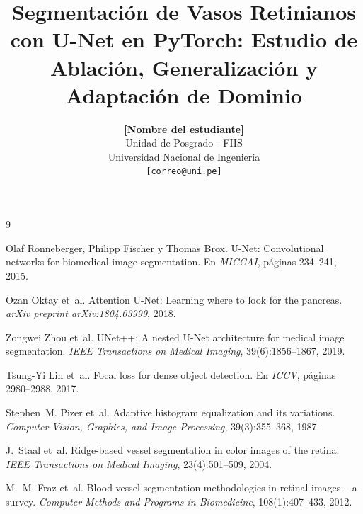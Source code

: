 \documentclass{article}
\title{Segmentación de Vasos Retinianos con U-Net en PyTorch: Estudio de Ablación, Generalización y Adaptación de Dominio}
\author{%
\textbf{[Nombre del estudiante]} \\
Unidad de Posgrado - FIIS \\
Universidad Nacional de Ingeniería \\
\texttt{[correo@uni.pe]}
}
\begin{document}
\maketitle










\begin{thebibliography}{9}

Olaf Ronneberger, Philipp Fischer y Thomas Brox.
\newblock U-Net: Convolutional networks for biomedical image segmentation.
\newblock En \emph{MICCAI}, páginas 234--241, 2015.

Ozan Oktay et~al.
\newblock Attention U-Net: Learning where to look for the pancreas.
\newblock \emph{arXiv preprint arXiv:1804.03999}, 2018.

Zongwei Zhou et~al.
\newblock UNet++: A nested U-Net architecture for medical image segmentation.
\newblock \emph{IEEE Transactions on Medical Imaging}, 39(6):1856--1867, 2019.

Tsung-Yi Lin et~al.
\newblock Focal loss for dense object detection.
\newblock En \emph{ICCV}, páginas 2980--2988, 2017.

Stephen~M. Pizer et~al.
\newblock Adaptive histogram equalization and its variations.
\newblock \emph{Computer Vision, Graphics, and Image Processing}, 39(3):355--368, 1987.

J.~Staal et~al.
\newblock Ridge-based vessel segmentation in color images of the retina.
\newblock \emph{IEEE Transactions on Medical Imaging}, 23(4):501--509, 2004.

M.~M. Fraz et~al.
\newblock Blood vessel segmentation methodologies in retinal images -- a survey.
\newblock \emph{Computer Methods and Programs in Biomedicine}, 108(1):407--433, 2012.

\end{thebibliography}
\end{document}
